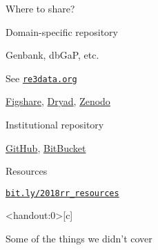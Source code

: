 \documentclass[12pt,t]{beamer}
\begin{document}
\begin{frame}[c]{Where to share?}

  \bi
\item Domain-specific repository
  \bi
  \item Genbank, dbGaP, etc.
  \item See \href{http://re3data.org}{\tt re3data.org}
  \ei
\item \href{https://figshare.com}{Figshare}, \href{https://datadryad.org}{Dryad}, \href{https://zenodo.org}{Zenodo}
\item Institutional repository
  \item \href{https://github.com}{GitHub}, \href{https://bitbucket.org}{BitBucket}
  \ei

\end{frame}


\begin{frame}[c]{Resources}


\centerline{  \href{https://bit.ly/2018rr_resources}{\Large \tt bit.ly/2018rr\_resources} }



\end{frame}


\begin{frame}<handout:0>[c]{}

  \begin{center}
    \large
    Some of the things we didn't cover
  \end{center}
\end{frame}
\end{document}
